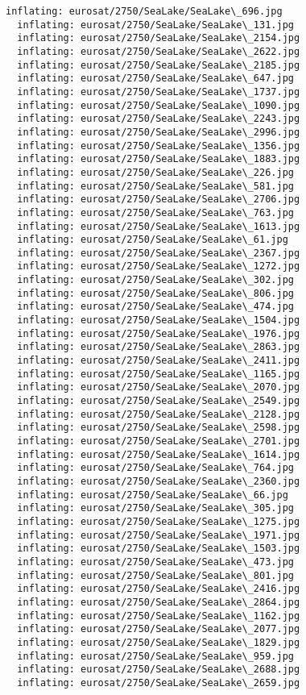 \documentclass[11pt]{article}
\begin{document}
\begin{Verbatim}[commandchars=\\\{\}]
  inflating: eurosat/2750/SeaLake/SeaLake\_696.jpg
  inflating: eurosat/2750/SeaLake/SeaLake\_131.jpg
  inflating: eurosat/2750/SeaLake/SeaLake\_2154.jpg
  inflating: eurosat/2750/SeaLake/SeaLake\_2622.jpg
  inflating: eurosat/2750/SeaLake/SeaLake\_2185.jpg
  inflating: eurosat/2750/SeaLake/SeaLake\_647.jpg
  inflating: eurosat/2750/SeaLake/SeaLake\_1737.jpg
  inflating: eurosat/2750/SeaLake/SeaLake\_1090.jpg
  inflating: eurosat/2750/SeaLake/SeaLake\_2243.jpg
  inflating: eurosat/2750/SeaLake/SeaLake\_2996.jpg
  inflating: eurosat/2750/SeaLake/SeaLake\_1356.jpg
  inflating: eurosat/2750/SeaLake/SeaLake\_1883.jpg
  inflating: eurosat/2750/SeaLake/SeaLake\_226.jpg
  inflating: eurosat/2750/SeaLake/SeaLake\_581.jpg
  inflating: eurosat/2750/SeaLake/SeaLake\_2706.jpg
  inflating: eurosat/2750/SeaLake/SeaLake\_763.jpg
  inflating: eurosat/2750/SeaLake/SeaLake\_1613.jpg
  inflating: eurosat/2750/SeaLake/SeaLake\_61.jpg
  inflating: eurosat/2750/SeaLake/SeaLake\_2367.jpg
  inflating: eurosat/2750/SeaLake/SeaLake\_1272.jpg
  inflating: eurosat/2750/SeaLake/SeaLake\_302.jpg
  inflating: eurosat/2750/SeaLake/SeaLake\_806.jpg
  inflating: eurosat/2750/SeaLake/SeaLake\_474.jpg
  inflating: eurosat/2750/SeaLake/SeaLake\_1504.jpg
  inflating: eurosat/2750/SeaLake/SeaLake\_1976.jpg
  inflating: eurosat/2750/SeaLake/SeaLake\_2863.jpg
  inflating: eurosat/2750/SeaLake/SeaLake\_2411.jpg
  inflating: eurosat/2750/SeaLake/SeaLake\_1165.jpg
  inflating: eurosat/2750/SeaLake/SeaLake\_2070.jpg
  inflating: eurosat/2750/SeaLake/SeaLake\_2549.jpg
  inflating: eurosat/2750/SeaLake/SeaLake\_2128.jpg
  inflating: eurosat/2750/SeaLake/SeaLake\_2598.jpg
  inflating: eurosat/2750/SeaLake/SeaLake\_2701.jpg
  inflating: eurosat/2750/SeaLake/SeaLake\_1614.jpg
  inflating: eurosat/2750/SeaLake/SeaLake\_764.jpg
  inflating: eurosat/2750/SeaLake/SeaLake\_2360.jpg
  inflating: eurosat/2750/SeaLake/SeaLake\_66.jpg
  inflating: eurosat/2750/SeaLake/SeaLake\_305.jpg
  inflating: eurosat/2750/SeaLake/SeaLake\_1275.jpg
  inflating: eurosat/2750/SeaLake/SeaLake\_1971.jpg
  inflating: eurosat/2750/SeaLake/SeaLake\_1503.jpg
  inflating: eurosat/2750/SeaLake/SeaLake\_473.jpg
  inflating: eurosat/2750/SeaLake/SeaLake\_801.jpg
  inflating: eurosat/2750/SeaLake/SeaLake\_2416.jpg
  inflating: eurosat/2750/SeaLake/SeaLake\_2864.jpg
  inflating: eurosat/2750/SeaLake/SeaLake\_1162.jpg
  inflating: eurosat/2750/SeaLake/SeaLake\_2077.jpg
  inflating: eurosat/2750/SeaLake/SeaLake\_1829.jpg
  inflating: eurosat/2750/SeaLake/SeaLake\_959.jpg
  inflating: eurosat/2750/SeaLake/SeaLake\_2688.jpg
  inflating: eurosat/2750/SeaLake/SeaLake\_2659.jpg

\end{Verbatim}
\end{document}
